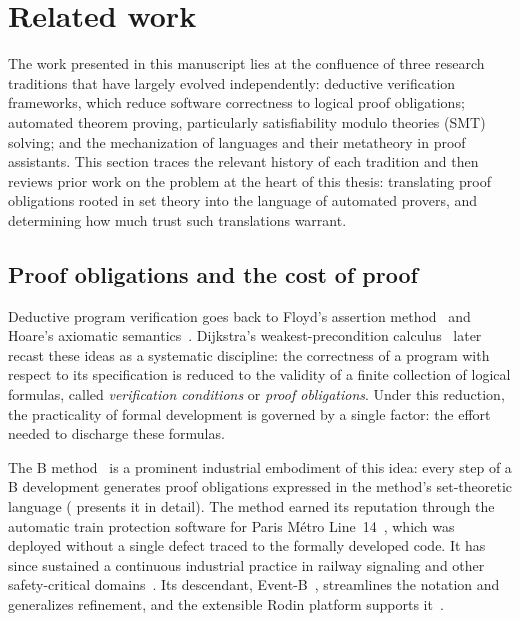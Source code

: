 \section{Related work}
\label{sec:intro-related-work}

The work presented in this manuscript lies at the confluence of three research
traditions that have largely evolved independently: deductive verification
frameworks, which reduce software correctness to logical proof obligations;
automated theorem proving, particularly satisfiability modulo theories (SMT)
solving; and the mechanization of languages and their metatheory in proof
assistants. This section traces the relevant history of each tradition and then
reviews prior work on the problem at the heart of this thesis: translating
proof obligations rooted in set theory into the language of automated provers,
and determining how much trust such translations warrant.

\subsection{Proof obligations and the cost of proof}
\label{subsec:rw-proof-obligations}

Deductive program verification goes back to Floyd's assertion
method~\cite{floyd1967meanings} and Hoare's axiomatic
semantics~\cite{hoare1969axiomatic}. Dijkstra's weakest-precondition
calculus~\cite{dijkstra1975guarded} later recast these ideas as a systematic
discipline: the correctness of a program with respect to its specification is
reduced to the validity of a finite collection of logical formulas, called
\emph{verification conditions} or \emph{proof obligations}. Under this
reduction, the practicality of formal development is governed by a single
factor: the effort needed to discharge these formulas.

The B method~\cite{abrial1996bbook} is a prominent industrial embodiment of
this idea: every step of a B development generates proof obligations expressed
in the method's set-theoretic language ( presents it in
detail). The method earned its reputation through the automatic train
protection software for Paris M\'etro Line~14~\cite{behm1999meteor}, which was
deployed without a single defect traced to the formally developed code. It has
since sustained a continuous industrial practice in railway signaling and
other safety-critical domains~\cite{butler2020first}. Its descendant,
Event-B~\cite{abrial2010modeling}, streamlines the notation and generalizes
refinement, and the extensible Rodin platform supports
it~\cite{abrial2010rodin}.

